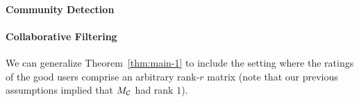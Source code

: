 \paragraph{Community Detection}

\paragraph{Collaborative Filtering}
We can generalize Theorem~\ref{thm:main-1} to include the setting 
where the ratings of the good users comprise an arbitrary rank-$r$ matrix (note 
that our previous assumptions implied that $M_{\mathcal{C}}$ had rank $1$).


